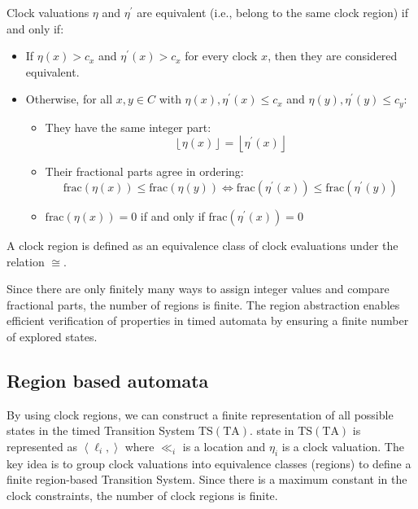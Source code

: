 \begin{definition}
    Clock valuations $\eta$ and $\eta^\prime$  are equivalent (i.e., belong to the same clock region) if and only if:
    \begin{itemize}
        \item If $\eta(x)>c_x$ and $\eta^\prime(x)>c_x$ for every clock $x$, then they are considered equivalent.
        \item Otherwise, for all $x,y\in C$ with $\eta(x), \eta^\prime(x)\leq c_x$ and $\eta(y), \eta^\prime(y)\leq c_y$: 
            \begin{itemize}
                \item They have the same integer part: 
                    \[\left\lfloor \eta(x)\right\rfloor=\left\lfloor \eta^\prime(x)\right\rfloor\]
                \item Their fractional parts agree in ordering: 
                    \[\text{frac}(\eta(x))\leq\text{frac}(\eta(y))\Leftrightarrow\text{frac}(\eta^\prime(x))\leq\text{frac}(\eta^\prime(y))\]
                \item $\text{frac}(\eta(x))=0$ if and only if $\text{frac}(\eta^\prime(x))=0$
            \end{itemize}
    \end{itemize}
\end{definition}
\begin{definition}
    A clock region is defined as an equivalence class of clock evaluations under the relation $\cong$. 
\end{definition}
\noindent Since there are only finitely many ways to assign integer values and compare fractional parts, the number of regions is finite.
The region abstraction enables efficient verification of properties in timed automata by ensuring a finite number of explored states.

\subsection{Region based automata}
By using clock regions, we can construct a finite representation of all possible states in the timed Transition System $\text{TS}(\text{TA})$.
state in $\text{TS}(\text{TA})$ is represented as $\left\langle \ell_i,\right\rangle$ where $\ll_i$ is a location and $\eta_i$ is a clock valuation.
The key idea is to group clock valuations into equivalence classes (regions) to define a finite region-based Transition System.
Since there is a maximum constant in the clock constraints, the number of clock regions is finite.

